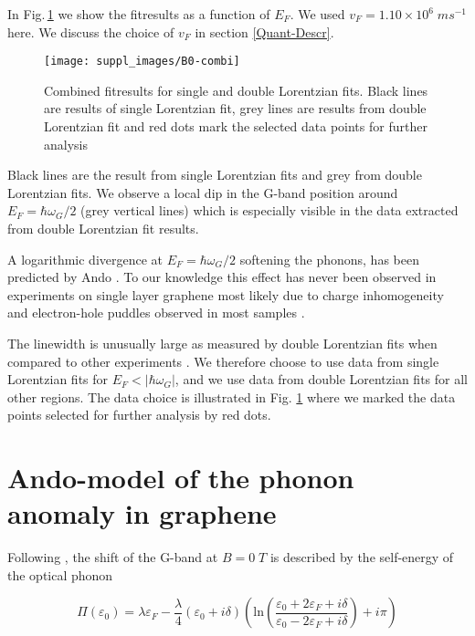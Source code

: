 \documentclass[pra,aps,superscriptaddress,preprint]{revtex4-1}
\begin{document}
\noindent
In Fig.\,\ref{b0-combi} we show the fitresults as a function of $E_F$. We used $v_F = 1.10 \times 10^6 \; ms^{-1}$ here. We discuss the choice of $v_F$ in section \ref{Quant-Descr}.
\noindent
\begin{figure}
   \texttt{[image: suppl\_images/B0-combi]}
   \caption{\label{b0-combi}Combined fitresults for single and double Lorentzian fits. Black lines are results of single Lorentzian fit, grey lines are results from double Lorentzian fit and red dots mark the selected data points for further analysis }
\end{figure}
\noindent
Black lines are the result from single Lorentzian fits and grey from double Lorentzian fits. We observe a local dip in the G-band position around $E_F=\hbar\omega_G/2$ (grey vertical lines) which is especially visible in the data extracted from double Lorentzian fit results.

A logarithmic divergence at $E_F=\hbar\omega_G/2$ softening the phonons, has been predicted by Ando \cite{tsuneya2006anomaly}. 
To our knowledge this effect has never been observed in experiments on single layer graphene most likely due to charge inhomogeneity and electron-hole puddles observed in most samples \cite{yan2007electric,martin2007observation}. 

The linewidth is unusually large as measured by double Lorentzian fits when compared to other experiments \citep{yan2007electric}. We therefore choose to use data from single Lorentzian fits for $E_F<\left|\hbar\omega_G\right|$, and we use data from double Lorentzian fits for all other regions. The data choice is illustrated in Fig. \ref{b0-combi} where we marked the data points selected for further analysis by red dots. 

\newpage
\section{Ando-model of the phonon anomaly in graphene}

Following \cite{tsuneya2006anomaly}, the shift of the G-band at $B=0\; T$ is described by the self-energy of the optical phonon

\noindent
\begin{equation}
\label{ando-anomaly}
\Pi(\varepsilon_0) = \lambda \varepsilon_F -\frac{\lambda}{4}\left(\varepsilon_0+i\delta\right)\left(\mathrm{ln}\left(\frac{\varepsilon_0+2\varepsilon_F+i\delta}{\varepsilon_0-2\varepsilon_F+i\delta}\right)+i\pi\right)
\end{equation}
\end{document}
